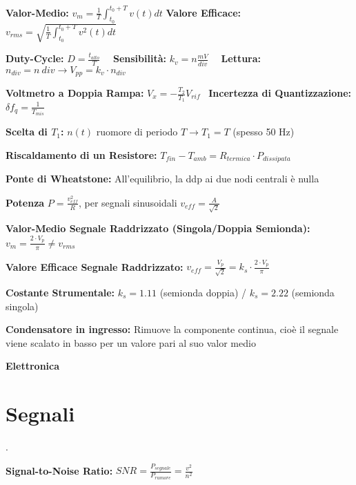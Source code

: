 \documentclass[12pt]{extarticle}
\begin{document}
{\bf Valor-Medio:} $\displaystyle v_m = \frac{1}{T} \int_{t_0}^{t_0+T} v(t)dt $ {\bf Valore Efficace:} $\displaystyle v_{rms}= \sqrt{\frac{1}{T} \int_{t_0}^{t_0+T} v^2(t)dt}$

{\bf Duty-Cycle:} $\displaystyle D = \frac{t_{alto}}{T}$ \ \ {\bf Sensibilità:} $\displaystyle k_v = n\frac{mV}{div}$ \ \ {\bf Lettura:} $\displaystyle n_{div} = n \ div \to  V_{pp} = k_v\cdot n_{div}$

{\bf Voltmetro a Doppia Rampa:} $\displaystyle V_x = -\frac{T_2}{T_1}V_{rif}$ \ {\bf Incertezza di Quantizzazione:} $\delta f_q = \frac{1}{T_{mis}}$

{\bf Scelta di $T_1$:} $n(t)$ ruomore di periodo $T \to T_1 = T$ (spesso 50 Hz)

{\bf Riscaldamento di un Resistore:} $\displaystyle T_{fin} - T_{amb} = R_{termica}\cdot P_{dissipata}$

{\bf Ponte di Wheatstone:} All'equilibrio, la ddp ai due nodi centrali è nulla 

{\bf Potenza} $\displaystyle P = \frac{v_{eff}^2}{R} $, per segnali sinusoidali $\displaystyle v_{eff} = \frac{A}{\sqrt{2}}$

{\bf Valor-Medio Segnale Raddrizzato (Singola/Doppia Semionda):}  $\displaystyle v_m = \frac{2\cdot V_p}{\pi} \neq v_{rms}$ 

{\bf Valore Efficace Segnale Raddrizzato:} $\displaystyle v_{eff} = \frac{V_p}{\sqrt{2}} = k_s\cdot\frac{2\cdot V_p}{\pi}$

{\bf Costante Strumentale:} $\displaystyle k_s = 1.11 $ (semionda doppia) / $\displaystyle k_s = 2.22 $ (semionda singola)

{\bf Condensatore in ingresso:} Rimuove la componente continua, cioè il segnale viene scalato in basso per un valore pari al suo valor medio


\newpage

{\bf \Huge Elettronica}
\setcounter{section}{0}
\section{Segnali}.


{\bf Signal-to-Noise Ratio:} $\displaystyle SNR = \frac{P_{segnale}}{P_{rumore}} = \frac{v^2}{n^2}$ 
\end{document}
